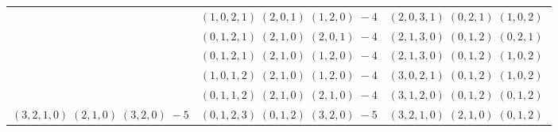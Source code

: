 \documentclass[11pt]{article}
\begin{document}
\begin{longtable}[l]{|c|c|c|}
 \cline{2-3} 
 & $(1 ,0 ,2 ,1) \;(2 ,0 ,1) \;(1 ,2 ,0) \;-4$ & $(2 ,0 ,3 ,1) \;(0 ,2 ,1) \;(1 ,0 ,2) \;$\\ 
 \cline{2-3} 
 & $(0 ,1 ,2 ,1) \;(2 ,1 ,0) \;(2 ,0 ,1) \;-4$ & $(2 ,1 ,3 ,0) \;(0 ,1 ,2) \;(0 ,2 ,1) \;$\\ 
 \cline{2-3} 
 & $(0 ,1 ,2 ,1) \;(2 ,1 ,0) \;(1 ,2 ,0) \;-4$ & $(2 ,1 ,3 ,0) \;(0 ,1 ,2) \;(1 ,0 ,2) \;$\\ 
 \cline{2-3} 
 & $(1 ,0 ,1 ,2) \;(2 ,1 ,0) \;(1 ,2 ,0) \;-4$ & $(3 ,0 ,2 ,1) \;(0 ,1 ,2) \;(1 ,0 ,2) \;$\\ 
 \cline{2-3} 
 & $(0 ,1 ,1 ,2) \;(2 ,1 ,0) \;(2 ,1 ,0) \;-4$ & $(3 ,1 ,2 ,0) \;(0 ,1 ,2) \;(0 ,1 ,2) \;$\\ \hline\multirow[t]{1}{*}{ $(3 ,2 ,1 ,0) \;(2 ,1 ,0) \;(3 ,2 ,0) \;-5$ }  & $(0 ,1 ,2 ,3) \;(0 ,1 ,2) \;(3 ,2 ,0) \;-5$ & $(3 ,2 ,1 ,0) \;(2 ,1 ,0) \;(0 ,1 ,2) \;$\\ \hline
  
 \end{longtable} 
 
\end{document}
